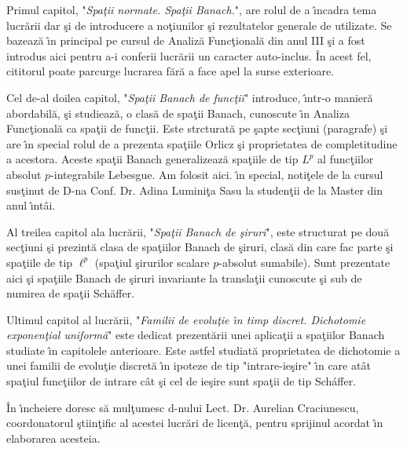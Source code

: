 \documentclass[12pt,a4paper]{book}
\begin{document}
Primul capitol, "\emph{Spa\c tii normate. Spa\c tii Banach.}", are rolul de a \^\i ncadra tema lucr\u arii dar \c si de introducere a no\c tiunilor \c si rezultatelor generale de utilizate. Se bazeaz\u a \^\i n principal pe cursul de Analiz\u a Func\c tional\u a din anul III \c si a fost introdus aici pentru a-i conferii lucr\u arii un caracter auto-inclus. \^ In acest fel, cititorul poate parcurge lucrarea f\u ar\u a a face apel la surse exterioare.

Cel de-al doilea capitol, "\emph{Spa\c tii Banach de func\c tii}" introduce, \^\i ntr-o manier\u a abordabil\u a, \c si studieaz\u a, o clas\u a de spa\c tii Banach, cunoscute \^\i n Analiza Func\c tional\u a ca spa\c tii de func\c tii. Este strcturat\u a pe \c sapte sec\c tiuni (paragrafe) \c si are \^\i n special rolul de a prezenta spa\c tiile Orlicz \c si proprietatea de completitudine a acestora. Aceste spa\c tii Banach generalizeaz\u a spa\c tiile de tip $L^p$ al func\c tiilor absolut $p$-integrabile Lebesgue. Am folosit aici. \^\i n special, noti\c tele de la cursul sus\c tinut de D-na Conf. Dr. Adina Lumini\c ta Sasu la studen\c tii de la Master din anul \^\i nt\^ ai.

Al treilea capitol ala lucr\u arii, "\emph{Spa\c tii Banach de \c siruri}", este structurat pe dou\u a sec\c tiuni \c si prezint\u a  clasa de spa\c tiilor Banach de \c siruri, clas\u a din care fac parte \c si spa\c tiile de tip $\ell^p$ (spa\c tiul \c sirurilor scalare $p$-absolut sumabile). Sunt prezentate aici \c si spa\c tiile Banach de \c siruri invariante la transla\c tii cunoscute \c si sub de numirea de spa\c tii Sch\" affer.

Ultimul capitol al lucr\u arii, "\emph{Familii de evolu\c tie \^\i n timp discret. Dichotomie exponen\c tial uniform\u a}" este dedicat prezent\u arii unei aplica\c tii a spa\c tiilor Banach studiate \^\i n capitolele anterioare. Este astfel studiat\u a proprietatea de dichotomie a unei familii de evolu\c tie discret\u a \^\i n ipoteze de tip "intrare-ie\c sire" \^\i n care at\^ at spa\c tiul func\c tiilor de intrare c\^ at \c si cel de ie\c sire sunt spa\c tii de tip Sch\' affer.

\^ In \^\i ncheiere doresc s\u a mul\c tumesc d-nului Lect. Dr. Aurelian Craciunescu, coordonatorul \c stiin\c tific al acestei lucr\u ari de licen\c t\u a, pentru sprijinul acordat \^\i n elaborarea acesteia.
\end{document}

